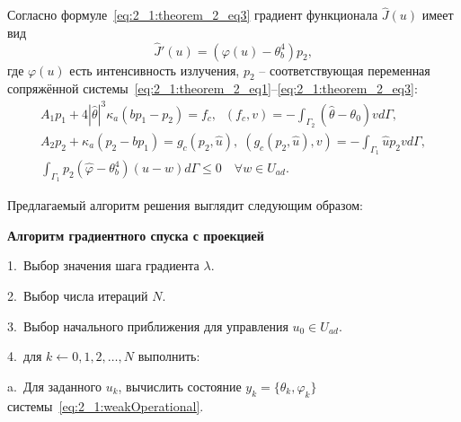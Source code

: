 Согласно формуле~\eqref{eq:2_1:theorem_2_eq3}
градиент функционала $\hat{J}(u)$ имеет вид
\[
    \hat{J}'(u)= (\varphi(u) -\theta_b^4)p_2,
\]
где $\varphi(u)$ есть интенсивность излучения,
$p_2$ -- соответствующая переменная сопряжённой
системы~\eqref{eq:2_1:theorem_2_eq1}--\eqref{eq:2_1:theorem_2_eq3}:
\begin{gather*}
    A_1 p_1 + 4 |\hat{\theta}|^3 \kappa_a(b p_1 - p_2) = f_c,
    \;\; (f_c,v) = - \int_{\Gamma_2} (\hat{\theta} - \theta_0) v d\Gamma, \\
    A_2 p_2 + \kappa_a (p_2-b p_1) = g_c(p_2, \hat{u}),
    \;(g_c(p_2, \hat{u}), v) = -\int_{\Gamma_1} \hat{u} p_2 v d\Gamma, \\
    \int_{\Gamma_1} p_2 (\hat{\varphi} - \theta_b^4)(u-w) d\Gamma
    \leq 0 \quad \forall w \in U_{ad}.
\end{gather*}


Предлагаемый алгоритм решения выглядит следующим образом:


\textbf{Алгоритм градиентного спуска с проекцией}

1.\ Выбор значения шага градиента $\lambda$.

2.\ Выбор числа итераций $N$.

3.\ Выбор начального приближения для управления $u_0 \in U_{ad}$.

4.\ для $k \leftarrow 0,1,2, \ldots, N$ выполнить:

\hspace{1cm} a.\ Для заданного $u_{k}$, вычислить состояние $y_k = \{\theta_k, \varphi_k\}$
системы~\eqref{eq:2_1:weakOperational}.

